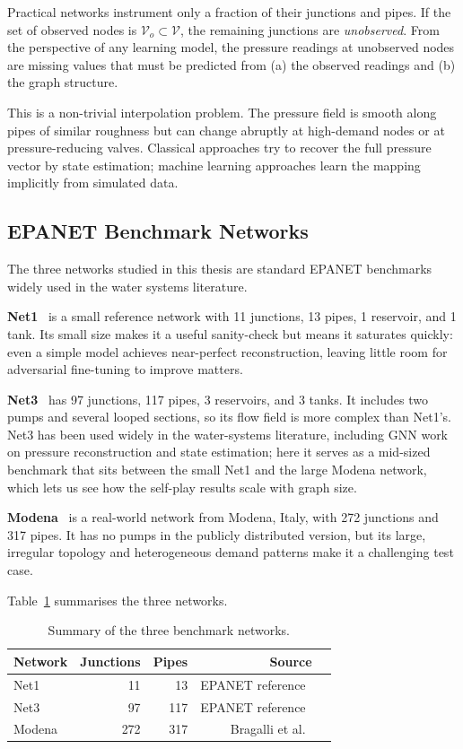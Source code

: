 Practical networks instrument only a fraction of their junctions
and pipes. If the set of observed nodes is $\mathcal{V}_o \subset
\mathcal{V}$, the remaining junctions are \emph{unobserved}. From
the perspective of any learning model, the pressure readings at
unobserved nodes are missing values that must be predicted from
(a) the observed readings and (b) the graph structure.

This is a non-trivial interpolation problem. The pressure field is
smooth along pipes of similar roughness but can change abruptly at
high-demand nodes or at pressure-reducing valves. Classical
approaches try to recover the full pressure vector by state
estimation; machine learning approaches learn the mapping implicitly
from simulated data.

\subsection{EPANET Benchmark Networks}

The three networks studied in this thesis are standard EPANET
benchmarks widely used in the water systems literature.

\textbf{Net1}~\cite{rossman2000epanet} is a small reference network
with 11 junctions, 13 pipes, 1 reservoir, and 1 tank. Its small size
makes it a useful sanity-check but means it saturates quickly: even
a simple model achieves near-perfect reconstruction, leaving little
room for adversarial fine-tuning to improve matters.

\textbf{Net3}~\cite{rossman2000epanet} has 97 junctions, 117 pipes,
3 reservoirs, and 3 tanks. It includes two pumps and several
looped sections, so its flow field is more complex than Net1's.
Net3 has been used widely in the water-systems literature, including
GNN work on pressure reconstruction and state estimation; here it
serves as a mid-sized benchmark that sits between the small Net1 and
the large Modena network, which lets us see how the self-play results
scale with graph size.

\textbf{Modena}~\cite{bragalli2012modena} is a real-world network
from Modena, Italy, with 272 junctions and 317 pipes. It has no
pumps in the publicly distributed version, but its large, irregular
topology and heterogeneous demand patterns make it a challenging
test case.

Table~\ref{tab:networks} summarises the three networks.

\begin{table}[htbp]
  \centering
  \caption{Summary of the three benchmark networks.}
  \label{tab:networks}
  \begin{tabular}{lrrrl}
    \toprule
    Network & Junctions & Pipes & Source \\
    \midrule
    Net1    & 11  & 13  & EPANET reference~\cite{rossman2000epanet} \\
    Net3    & 97  & 117 & EPANET reference~\cite{rossman2000epanet} \\
    Modena  & 272 & 317 & Bragalli et al.~\cite{bragalli2012modena} \\
    \bottomrule
  \end{tabular}
\end{table}


